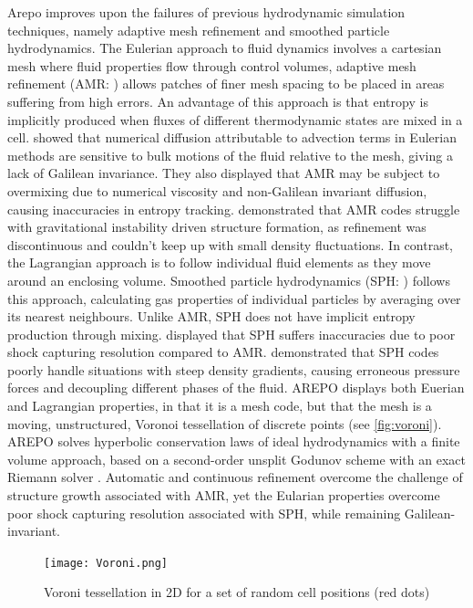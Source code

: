 \documentclass[11pt]{article}
\begin{document}
Arepo improves upon the failures of previous hydrodynamic simulation techniques, namely adaptive mesh refinement and smoothed particle hydrodynamics. The Eulerian approach to fluid dynamics involves a cartesian mesh where fluid properties flow through control volumes, adaptive mesh refinement (AMR: \citealt{Berger1989}) allows patches of finer mesh spacing to be placed in areas suffering from high errors. An advantage of this approach is that entropy is implicitly produced when fluxes of different thermodynamic states are mixed in a cell. \cite{Wadsley2008} showed that numerical diffusion attributable to advection terms in Eulerian methods are sensitive to bulk motions of the fluid relative to the mesh, giving a lack of Galilean invariance. They also displayed that AMR may be subject to overmixing due to numerical viscosity and non-Galilean invariant diffusion, causing inaccuracies in entropy tracking. \cite{Heitmann2008} demonstrated that AMR codes struggle with gravitational instability driven structure formation, as refinement was discontinuous and couldn’t keep up with small density fluctuations. In contrast, the Lagrangian approach is to follow individual fluid elements as they move around an enclosing volume. Smoothed particle hydrodynamics (SPH: \citealt{Monaghan1992}) follows this approach, calculating gas properties of individual particles by averaging over its nearest neighbours. Unlike AMR, SPH does not have implicit entropy production through mixing. \cite{Moore2000} displayed that SPH suffers inaccuracies due to poor shock capturing resolution compared to AMR. \cite{Agertz2007} demonstrated that SPH codes poorly handle situations with steep density gradients, causing erroneous pressure forces and decoupling different phases of the fluid. AREPO displays both Euerian and Lagrangian properties, in that it is a mesh code, but that the mesh is a moving, unstructured, Voronoi tessellation of discrete points (see \autoref{fig:voroni}). AREPO solves hyperbolic conservation laws of ideal hydrodynamics with a finite volume approach, based on a second-order unsplit Godunov scheme with an exact Riemann solver \citep{Springel2010}. Automatic and continuous refinement overcome the challenge of structure growth associated with AMR, yet the Eularian properties overcome poor shock capturing resolution associated with SPH, while remaining Galilean-invariant. 

\begin{figure}[h!]
         \centering
		\texttt{[image: Voroni.png]}
		\caption{Voroni tessellation in 2D for a set of random cell positions (red dots) \citep{Springel2010}}
		\label{fig:voroni}
\end{figure}
\end{document}
